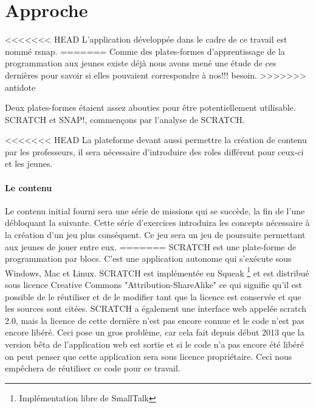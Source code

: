 \section{Approche}
\label{intro-approche}
<<<<<<< HEAD
L'application développée dans le cadre de ce travail est nommé \gls{rsnap}.
=======
Comme des plates-formes d'apprentissage de la programmation aux jeunes existe déjà nous avons mené une étude de ces dernières pour savoir si elles pouvaient correspondre à nos!!! besoin.
>>>>>>> antidote

Deux plates-formes étaient assez abouties pour être potentiellement utilisable. SCRATCH et SNAP!, commençons par l'analyse de SCRATCH.

<<<<<<< HEAD
La plateforme devant aussi permettre la création de contenu par les professeurs, il sera nécessaire d'introduire des \glspl{role} différent pour ceux-ci et les jeunes.

\paragraph{Le contenu} Le contenu initial fourni sera une série de \glspl{mission} qui se succède, la fin de l'une débloquant la suivante. Cette série d'exercices introduira les concepts nécessaire à la création d'un jeu plus conséquent. Ce jeu sera un jeu de poursuite permettant aux jeunes de jouer entre eux.
=======
SCRATCH est une plate-forme de programmation par blocs. C'est une application autonome qui s'exécute sous Windows, Mac et Linux. SCRATCH est implémentée en Squeak \footnote{Implémentation libre de SmallTalk} et est distribué sous licence Creative Commons "Attribution-ShareAlike" ce qui signifie qu'il est possible de le réutiliser et de le modifier tant que la licence est conservée et que les sources sont citées. SCRATCH a également une interface web appelée scratch 2.0, mais la licence de cette dernière n'est pas encore connue et le code n'est pas encore libéré. Ceci pose un gros problème, car cela fait depuis début 2013 que la version bêta de l'application web est sortie et si le code n'a pas encore été libéré on peut penser que cette application sera sous licence propriétaire. Ceci nous empêchera de réutiliser ce code pour ce travail.

